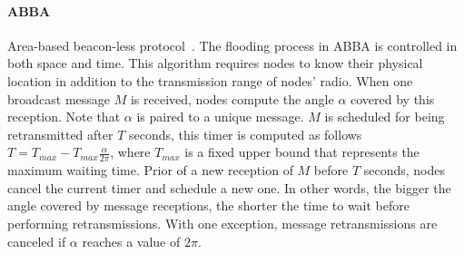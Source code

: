 \paragraph{ABBA} Area-based beacon-less protocol~\cite{Ovalle-Martinez2006}.
The flooding process in ABBA is controlled in both space and time.
%
This algorithm requires nodes to know their physical location in addition to the transmission range of nodes' radio.
%
When one broadcast message $M$ is received, nodes compute the angle $\alpha$ covered by this reception.
%
Note that $\alpha$ is paired to a unique message.
%
$M$ is scheduled for being retransmitted after $T$ seconds, this timer is computed as follows $T = T_\textit{max} - T_\textit{max}\frac{\alpha}{2\pi}$, where $T_\textit{max}$ is a fixed upper bound that represents the maximum waiting time.
%
Prior of a new reception of $M$ before $T$ seconds, nodes cancel the current timer and schedule a new one.
%
In other words, the bigger the angle covered by message receptions, the shorter the time to wait before performing retransmissions.
%
With one exception, message retransmissions are canceled if $\alpha$ reaches a value of $2\pi$.



		



%
%
%



